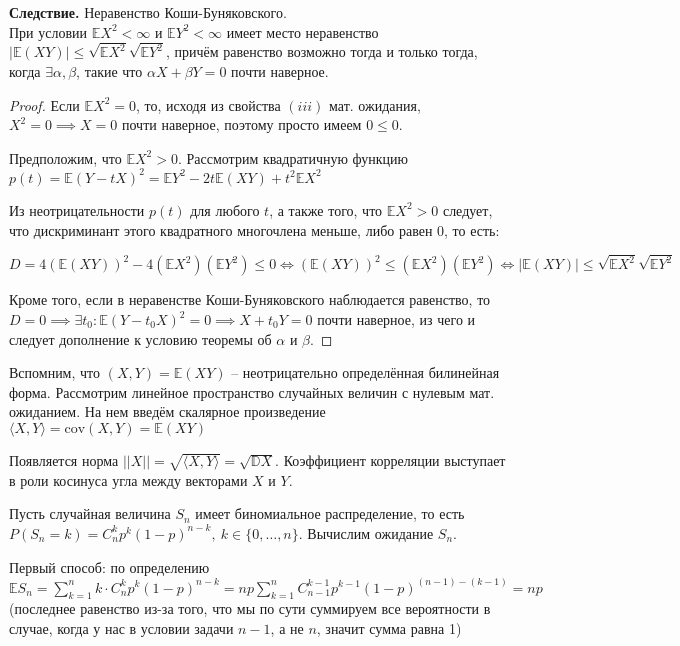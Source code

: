\documentclass[a4paper]{article}
\begin{document}
\begin{colloq}
   	\textbf{Следствие.} Неравенство Коши-Буняковского. \\
   		При условии $\mathbb{E}X^2 < \infty$ и $\mathbb{E}Y^2 < \infty$ имеет место неравенство $\left| \mathbb{E}(XY) \right| \leqslant \sqrt{\mathbb{E}X^2} \sqrt{\mathbb{E}Y^2}$, причём равенство возможно тогда и только тогда, когда $\exists \alpha, \beta$, такие что $\alpha X + \beta Y = 0$ почти наверное.
   	
   	\begin{proof}
   		Если $\mathbb{E}X^2 = 0$, то, исходя из свойства $(iii)$ мат. ожидания, $X^2 = 0 \implies X = 0$ почти наверное,
   		поэтому просто имеем $0 \leqslant 0$.
   		
   		Предположим, что $\mathbb{E}X^2 > 0$. Рассмотрим квадратичную функцию $p(t) = \mathbb{E}(Y - tX)^2 = \mathbb{E}Y^2 - 2t \mathbb{E}(XY) + t^2 \mathbb{E}X^2$
   		
   		Из неотрицательности $p(t)$ для любого $t$, а также того, что $\mathbb{E}X^2 > 0$ следует, что дискриминант этого квадратного многочлена меньше, либо равен 0, то есть:
   		
   		$D = 4 (\mathbb{E}(XY))^2 - 4 (\mathbb{E}X^2) (\mathbb{E} Y^2) \leqslant 0 \iff (\mathbb{E}(XY))^2 \leqslant (\mathbb{E}X^2) (\mathbb{E} Y^2) \iff \left| \mathbb{E}(XY) \right| \leqslant \sqrt{\mathbb{E}X^2} \sqrt{\mathbb{E} Y^2}$
   		
   		Кроме того, если в неравенстве Коши-Буняковского наблюдается равенство, то $D = 0 \implies \exists t_0: \mathbb{E}(Y - t_0 X)^2 = 0 \implies X + t_0 Y = 0$ почти наверное, из чего и следует дополнение к условию теоремы об $\alpha$ и $\beta$.
   	\end{proof}
   	
   	Вспомним, что $(X, Y) = \mathbb{E}(XY)$ -- неотрицательно определённая билинейная форма. Рассмотрим линейное пространство случайных величин с нулевым мат. ожиданием. На нем введём скалярное произведение $\langle X, Y \rangle = \mathrm{cov}(X, Y) = \mathbb{E}(XY)$
   	
   	Появляется норма $||X|| = \sqrt{\langle X, Y \rangle} = \sqrt{\mathbb{D}X}$. Коэффициент корреляции выступает в роли косинуса угла между векторами $X$ и $Y$.
   	
   	\begin{example}
   		Пусть случайная величина $S_n$ имеет биномиальное распределение, то есть $P(S_n = k) = C_n^k p^k (1 - p)^{n - k},\ k \in \{0, \dots, n\}$. Вычислим ожидание $S_n$.

   		Первый способ: по определению $\mathbb{E}S_n = \sum_{k = 1}^n k \cdot C_n^k p^k (1 - p)^{n - k} = np \sum_{k = 1}^n C_{n-1}^{k-1} p^{k - 1} (1 - p)^{(n - 1) - (k - 1)} = np$ (последнее равенство из-за того, что мы по сути суммируем все вероятности в случае, когда у нас в условии задачи $n - 1$, а не $n$, значит сумма равна 1)
   			

\end{example}
\end{colloq}
\end{document}
